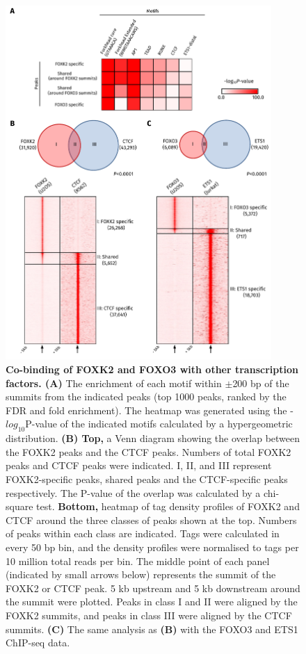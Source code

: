 \begin{figure}[!ht]
    \centering
    \includegraphics[width=0.9\textwidth]{chapter3/figures_foxo3/fig48.pdf}
    \caption[Co-binding of FOXK2 and FOXO3 with other transcription factors]{\textbf{Co-binding of FOXK2 and FOXO3 with other transcription factors. (A)} The enrichment of each motif within  $\pm$200 bp of the summits from the indicated peaks (top 1000 peaks, ranked by the FDR and fold enrichment). The heatmap was generated using the -$log_{10}$P-value of the indicated motifs calculated by a hypergeometric distribution. \textbf{(B) Top,} a Venn diagram showing the overlap between the FOXK2 peaks and the CTCF peaks. Numbers of total FOXK2 peaks and CTCF peaks were indicated. I, II, and III represent FOXK2-specific peaks, shared peaks and the CTCF-specific peaks respectively. The P-value of the overlap was calculated by a chi-square test. \textbf{Bottom,} heatmap of tag density profiles of FOXK2 and CTCF around the three classes of peaks shown at the top. Numbers of peaks within each class are indicated. Tags were calculated in every 50 bp bin, and the density profiles were normalised to tags per 10 million total reads per bin. The middle point of each panel (indicated by small arrows below) represents the summit of the FOXK2 or CTCF peak. 5 kb upstream and 5 kb downstream around the summit were plotted. Peaks in class I and II were aligned by the FOXK2 summits, and peaks in class III were aligned by the CTCF summits. \textbf{(C)} The same analysis as \textbf{(B)} with the FOXO3 and ETS1 ChIP-seq data.}
    \label{fig:fig48}
\end{figure}

